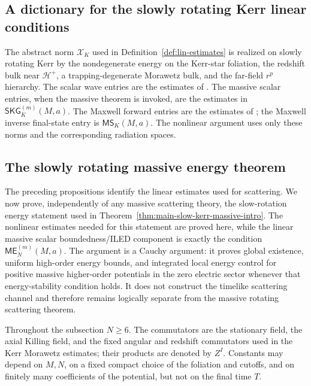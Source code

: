 \documentclass[11pt]{article}
\numberwithin{equation}{section}
\theoremstyle{plain}
\theoremstyle{definition}
\theoremstyle{remark}
\newcommand{\SKG}{\mathsf{SKG}}
\newcommand{\ME}{\mathsf{ME}}
\newcommand{\MScat}{\mathsf{MS}}
\begin{document}
\subsection*{\small A dictionary for the slowly rotating Kerr linear conditions}\label{subsec:kerr-dictionary}
The abstract norm \(\mathcal X_K\) used in Definition~\ref{def:lin-estimates} is realized on slowly rotating Kerr by the nondegenerate energy on the Kerr-star foliation, the redshift bulk near \(\mathcal H^+\), a trapping-degenerate Morawetz bulk, and the far-field \(r^p\) hierarchy.  The scalar wave entries are the estimates of \cite{DRSRKerr,DRSRKerrIII}.  The massive scalar entries, when the massive theorem is invoked, are the estimates in \(\SKG^{(m)}_K(M,a)\).  The Maxwell forward entries are the estimates of \cite{AnderssonBlueMaxwellSlowKerr}; the Maxwell inverse final-state entry is \(\MScat_K(M,a)\).  The nonlinear argument uses only these norms and the corresponding radiation spaces.



\subsection{The slowly rotating massive energy theorem}\label{subsec:slow-massive-energy-method}

The preceding propositions identify the linear estimates used for scattering.  We now prove, independently of any massive scattering theory, the slow-rotation energy statement used in Theorem~\ref{thm:main-slow-kerr-massive-intro}.  The nonlinear estimates needed for this statement are proved here, while the linear massive scalar boundedness/ILED component is exactly the condition \(\ME^{(m)}_N(M,a)\).  The argument is a Cauchy argument: it proves global existence, uniform high-order energy bounds, and integrated local energy control for positive massive higher-order potentials in the zero electric sector whenever that energy-stability condition holds.  It does not construct the timelike scattering channel and therefore remains logically separate from the massive rotating scattering theorem.

Throughout the subsection \(N\ge6\).  The commutators are the stationary field, the axial Killing field, and the fixed angular and redshift commutators used in the Kerr Morawetz estimates; their products are denoted by \(Z^I\).  Constants may depend on \(M,N\), on a fixed compact choice of the foliation and cutoffs, and on finitely many coefficients of the potential, but not on the final time \(T\).
\end{document}
